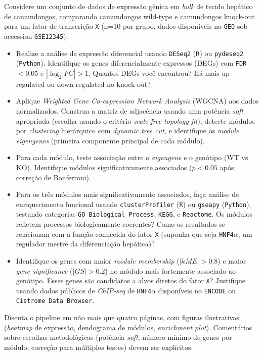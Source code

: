 \begin{exercicio}[$\star\star$] Considere um conjunto de dados de expressão gênica em \emph{bulk} de tecido hepático de camundongos, comparando camundongos wild-type e camundongos knock-out para um fator de transcrição \texttt{X} (n=10 por grupo, dados disponíveis no \texttt{GEO} sob accession \texttt{GSE12345}).
\begin{itemize}
  \item[(a)] Realize a análise de expressão diferencial usando \texttt{DESeq2} (\texttt{R}) ou \texttt{pydeseq2} (\texttt{Python}). Identifique os genes diferencialmente expressos (DEGs) com \texttt{FDR} \(< 0.05\) e \(|\log_2 FC| > 1\). Quantos DEGs você encontrou? Há mais up-regulated ou down-regulated no knock-out?
  \item[(b)] Aplique \emph{Weighted Gene Co-expression Network Analysis} (WGCNA) aos dados normalizados. Construa a matriz de adjacência usando uma potência \emph{soft} apropriada (escolha usando o critério \emph{scale-free topology fit}), detecte módulos por \emph{clustering} hierárquico com \emph{dynamic tree cut}, e identifique os \emph{module eigengenes} (primeira componente principal de cada módulo).
  \item[(c)] Para cada módulo, teste associação entre o \emph{eigengene} e o genótipo (WT vs KO). Identifique módulos significativamente associados (\(p < 0.05\) após correção de Bonferroni).
  \item[(d)] Para os três módulos mais significativamente associados, faça análise de enriquecimento funcional usando \texttt{clusterProfiler} (\texttt{R}) ou \texttt{gseapy} (\texttt{Python}), testando categorias \texttt{GO Biological Process}, \texttt{KEGG}, e \texttt{Reactome}. Os módulos refletem processos biologicamente coerentes? Como os resultados se relacionam com a função conhecida do fator \texttt{X} (suponha que seja \texttt{HNF4\(\alpha\)}, um regulador mestre da diferenciação hepática)?
  \item[(e)] Identifique os genes com maior \emph{module membership} (\(|kME| > 0.8\)) e maior \emph{gene significance} (\(|GS| > 0.2\)) no módulo mais fortemente associado ao genótipo. Esses genes são candidatos a alvos diretos do fator \texttt{X}? Justifique usando dados públicos de \emph{ChIP-seq} de \texttt{HNF4\(\alpha\)} disponíveis no \texttt{ENCODE} ou \texttt{Cistrome Data Browser}.
\end{itemize}
Discuta o pipeline em não mais que quatro páginas, com figuras ilustrativas (\emph{heatmap} de expressão, dendograma de módulos, \emph{enrichment plot}). Comentários sobre escolhas metodológicas (potência \emph{soft}, número mínimo de genes por módulo, correção para múltiplos testes) devem ser explícitos.
\end{exercicio}



